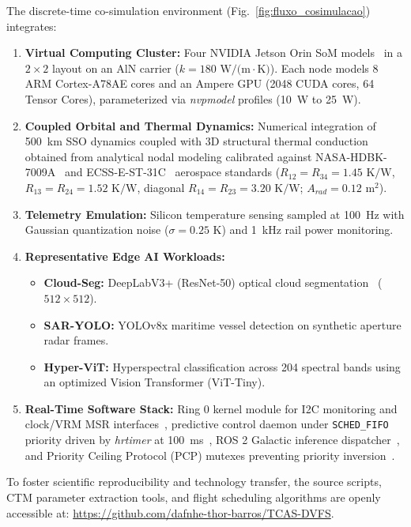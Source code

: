 \documentclass[journal]{IEEEtran}
\begin{document}
The discrete-time co-simulation environment (Fig.~\ref{fig:fluxo_cosimulacao}) integrates:
\begin{enumerate}
    \item \textbf{Virtual Computing Cluster:} Four NVIDIA Jetson Orin SoM models~\cite{ortiz2024spirit} in a $2 \times 2$ layout on an AlN carrier ($k = 180\text{ W/(m}\cdot\text{K)}$). Each node models 8 ARM Cortex-A78AE cores and an Ampere GPU (2048 CUDA cores, 64 Tensor Cores), parameterized via \textit{nvpmodel} profiles (10~W to 25~W).
    \item \textbf{Coupled Orbital and Thermal Dynamics:} Numerical integration of 500~km SSO dynamics coupled with 3D structural thermal conduction obtained from analytical nodal modeling calibrated against NASA-HDBK-7009A~\cite{nasa2022handbook} and ECSS-E-ST-31C~\cite{ecss2008thermal} aerospace standards ($R_{12} = R_{34} = 1.45\text{ K/W}$, $R_{13} = R_{24} = 1.52\text{ K/W}$, diagonal $R_{14} = R_{23} = 3.20\text{ K/W}$; $A_{rad} = 0.12\text{ m}^2$).
    \item \textbf{Telemetry Emulation:} Silicon temperature sensing sampled at 100~Hz with Gaussian quantization noise ($\sigma = 0.25\text{ K}$) and 1~kHz rail power monitoring.
    \item \textbf{Representative Edge AI Workloads:}
    \begin{itemize}
        \item \textbf{Cloud-Seg:} DeepLabV3+ (ResNet-50) optical cloud segmentation~\cite{giuffrida2021phisat1, sherwood2003ase} ($512 \times 512$).
        \item \textbf{SAR-YOLO:} YOLOv8x maritime vessel detection on synthetic aperture radar frames.
        \item \textbf{Hyper-ViT:} Hyperspectral classification across 204 spectral bands using an optimized Vision Transformer (ViT-Tiny).
    \end{itemize}
    \item \textbf{Real-Time Software Stack:} Ring 0 kernel module for I2C monitoring and clock/VRM MSR interfaces~\cite{corbet2005ldd, pallipadi2006ondemand}, predictive control daemon under \texttt{SCHED\_FIFO} priority driven by \textit{hrtimer} at 100~ms~\cite{gleixner2006hrtimers}, ROS 2 Galactic inference dispatcher~\cite{macenski2022ros2}, and Priority Ceiling Protocol (PCP) mutexes preventing priority inversion~\cite{sha1990priority}.
\end{enumerate}

To foster scientific reproducibility and technology transfer, the source scripts, CTM parameter extraction tools, and flight scheduling algorithms are openly accessible at: \url{https://github.com/dafnhe-thor-barros/TCAS-DVFS}.
\end{document}
